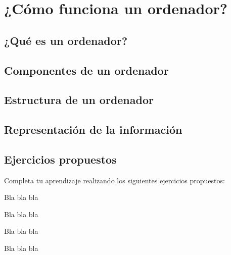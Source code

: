 
\chapter{¿Cómo funciona un ordenador?}

\section{¿Qué es un ordenador?}

\section{Componentes de un ordenador}

\section{Estructura de un ordenador}

\section{Representación de la información}

\section{Ejercicios propuestos}

Completa tu aprendizaje realizando los siguientes ejercicios propuestos:

\begin{exercise}
Bla bla bla
\end{exercise}

\begin{exercise}
Bla bla bla
\end{exercise}

\begin{exercise}
Bla bla bla
\end{exercise}

\begin{exercise}
Bla bla bla
\end{exercise}

